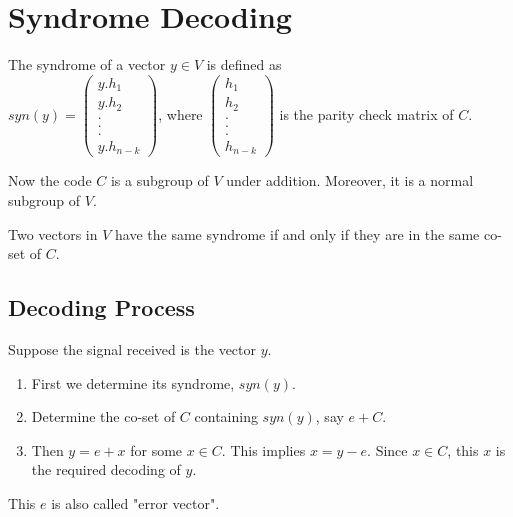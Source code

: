 \section{Syndrome Decoding}
\begin{definition}
    The syndrome of a vector \(y \in V\) is defined as \\ \(syn(y)=\begin{pmatrix}
        y.h_1\\
        y.h_2\\
        .\\
        .\\
        .\\
        y.h_{n-k}
    \end{pmatrix}\), \hspace{12mm} where \(\begin{pmatrix}
        h_1 \\ h_2\\ .\\ .\\ .\\ h_{n-k}
    \end{pmatrix}\) is the parity check matrix of \(C\).
\end{definition}
\vspace{3mm}
Now the code \(C\) is a subgroup of \(V\) under addition. Moreover, it is a normal subgroup of \(V\).
\begin{theorem}
    Two vectors in \(V\) have the same syndrome if and only if they are in the same co-set of \(C\).
\end{theorem}

\subsection{Decoding Process}
Suppose the signal received is the vector \(y\).
\begin{enumerate}
    \item First we determine its syndrome, \(syn(y)\).
    \item Determine the co-set of \(C\) containing \(syn(y)\), say \(e + C\).
    \item Then \(y=e+x\) for some \(x \in C\). This implies \(x=y-e\). Since \(x \in C\), this \(x\) is the required decoding of \(y\).
\end{enumerate}
This \(e\) is also called "error vector".
\vspace{2mm}

